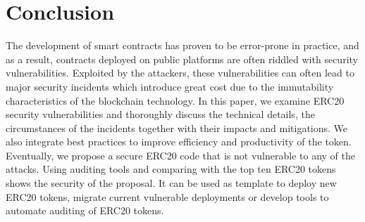 
\section{Conclusion}

The development of smart contracts has proven to be error-prone in practice, and as a result, contracts deployed on public platforms are often riddled with security vulnerabilities. Exploited by the attackers, these vulnerabilities can often lead to major security incidents which introduce great cost due to the immutability characteristics of the blockchain technology. In this paper, we examine ERC20 security vulnerabilities and thoroughly discuss the technical details, the circumstances of the incidents together with their impacts and mitigations. We also integrate best practices to improve efficiency and productivity of the token. Eventually, we propose a secure ERC20 code that is not vulnerable to any of the attacks. Using auditing tools and comparing with the top ten ERC20 tokens shows the security of the proposal. It can be used as template to deploy new ERC20 tokens, migrate current vulnerable deployments or develop tools to automate auditing of ERC20 tokens.




